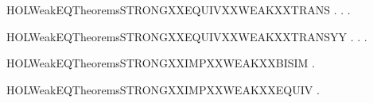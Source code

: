 \newcommand{\HOLWeakEQTheoremsSTRONGXXEQUIVXXEPSYY}{\UseVerbatim{HOLWeakEQTheoremsSTRONGXXEQUIVXXEPSYY}}
\begin{SaveVerbatim}{HOLWeakEQTheoremsSTRONGXXEQUIVXXWEAKXXTRANS}
\HOLTokenTurnstile{} \HOLSymConst{\HOLTokenForall{}} .
          \HOLSymConst{\HOLTokenImp{}}
       \HOLSymConst{\HOLTokenForall{}} .  \HOLTokenWeakTransBegin{}\HOLTokenWeakTransEnd {} \HOLSymConst{\HOLTokenImp{}} \HOLSymConst{\HOLTokenExists{}}.  \HOLTokenWeakTransBegin{}\HOLTokenWeakTransEnd {} \HOLSymConst{\HOLTokenConj{}}   
\end{SaveVerbatim}
\newcommand{\HOLWeakEQTheoremsSTRONGXXEQUIVXXWEAKXXTRANS}{\UseVerbatim{HOLWeakEQTheoremsSTRONGXXEQUIVXXWEAKXXTRANS}}
\begin{SaveVerbatim}{HOLWeakEQTheoremsSTRONGXXEQUIVXXWEAKXXTRANSYY}
\HOLTokenTurnstile{} \HOLSymConst{\HOLTokenForall{}} .
          \HOLSymConst{\HOLTokenImp{}}
       \HOLSymConst{\HOLTokenForall{}} .  \HOLTokenWeakTransBegin{}\HOLTokenWeakTransEnd {} \HOLSymConst{\HOLTokenImp{}} \HOLSymConst{\HOLTokenExists{}}.  \HOLTokenWeakTransBegin{}\HOLTokenWeakTransEnd {} \HOLSymConst{\HOLTokenConj{}}   
\end{SaveVerbatim}
\newcommand{\HOLWeakEQTheoremsSTRONGXXEQUIVXXWEAKXXTRANSYY}{\UseVerbatim{HOLWeakEQTheoremsSTRONGXXEQUIVXXWEAKXXTRANSYY}}
\begin{SaveVerbatim}{HOLWeakEQTheoremsSTRONGXXIMPXXWEAKXXBISIM}
\HOLTokenTurnstile{} \HOLSymConst{\HOLTokenForall{}}.   \HOLSymConst{\HOLTokenImp{}}  
\end{SaveVerbatim}
\newcommand{\HOLWeakEQTheoremsSTRONGXXIMPXXWEAKXXBISIM}{\UseVerbatim{HOLWeakEQTheoremsSTRONGXXIMPXXWEAKXXBISIM}}
\begin{SaveVerbatim}{HOLWeakEQTheoremsSTRONGXXIMPXXWEAKXXEQUIV}
\HOLTokenTurnstile{} \HOLSymConst{\HOLTokenForall{}} .    \HOLSymConst{\HOLTokenImp{}}   
\end{SaveVerbatim}
